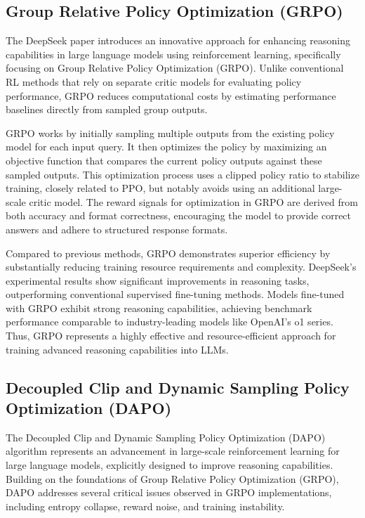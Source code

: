 \documentclass[11pt, oneside]{article}   	%
\begin{document}
\subsection*{Group Relative Policy Optimization (GRPO) \cite{deepseekai2025deepseekr1incentivizingreasoningcapability}}

The DeepSeek paper introduces an innovative approach for enhancing reasoning capabilities in large language models using reinforcement learning, specifically focusing on Group Relative Policy Optimization (GRPO). Unlike conventional RL methods that rely on separate critic models for evaluating policy performance, GRPO reduces computational costs by estimating performance baselines directly from sampled group outputs.

GRPO works by initially sampling multiple outputs from the existing policy model for each input query. It then optimizes the policy by maximizing an objective function that compares the current policy outputs against these sampled outputs. This optimization process uses a clipped policy ratio to stabilize training, closely related to PPO, but notably avoids using an additional large-scale critic model. The reward signals for optimization in GRPO are derived from both accuracy and format correctness, encouraging the model to provide correct answers and adhere to structured response formats.

Compared to previous methods, GRPO demonstrates superior efficiency by substantially reducing training resource requirements and complexity. DeepSeek’s experimental results show significant improvements in reasoning tasks, outperforming conventional supervised fine-tuning methods. Models fine-tuned with GRPO exhibit strong reasoning capabilities, achieving benchmark performance comparable to industry-leading models like OpenAI's o1 series. Thus, GRPO represents a highly effective and resource-efficient approach for training advanced reasoning capabilities into LLMs.

\subsection*{Decoupled Clip and Dynamic Sampling Policy Optimization (DAPO) \cite{yu2025dapoopensourcellmreinforcement}}

The Decoupled Clip and Dynamic Sampling Policy Optimization (DAPO) algorithm represents an advancement in large-scale reinforcement learning for large language models, explicitly designed to improve reasoning capabilities. Building on the foundations of Group Relative Policy Optimization (GRPO), DAPO addresses several critical issues observed in GRPO implementations, including entropy collapse, reward noise, and training instability.
\end{document}
